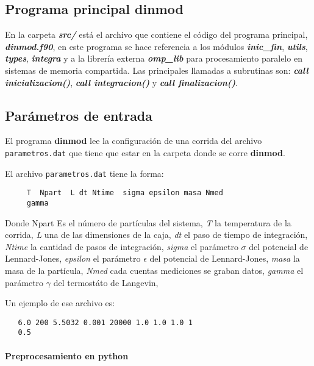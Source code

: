 \subsection{Programa principal dinmod}

En la carpeta \textbf{\textit{src/}} está el archivo que contiene el código del programa principal,
\textbf{\textit{dinmod.f90}}, en este programa se hace referencia a los módulos \textbf{\textit{inic\_fin}}, \textbf{\textit{utils}},
\textbf{\textit{types}}, \textbf{\textit{integra}} y a la librería externa \textbf{\textit{omp\_lib}} para procesamiento paralelo en sistemas de memoria compartida. 
Las principales llamadas a subrutinas son:
\textbf{\textit{call inicializacion()}},  \textbf{\textit{ call integracion()}} y \textbf{\textit{ call finalizacion()}}.



\subsection{Par\'ametros de entrada}

El programa \textbf{\textbf{dinmod}} lee la configuraci\'on de una corrida del 
archivo \texttt{parametros.dat} que tiene que estar en la carpeta donde se
corre \textbf{\textbf{dinmod}}.

El archivo \texttt{parametros.dat} tiene la forma: 

\begin{verbatim}
     T  Npart  L dt Ntime  sigma epsilon masa Nmed
     gamma
\end{verbatim}

Donde Npart
Es el número de partículas del sistema, \textit{T} la temperatura de la corrida,
\textit{L} una de las dimensiones de la caja, \textit{dt} el paso de tiempo de integración,
\textit{Ntime} la cantidad de pasos de integración,
\textit{sigma} el parámetro $\sigma$ del potencial de Lennard-Jones,
\textit{epsilon} el parámetro $\epsilon$ del potencial de Lennard-Jones,
\textit{masa} la masa de la partícula,
\textit{Nmed} cada cuentas mediciones se graban datos,
\textit{gamma} el parámetro $\gamma$ del termostáto de Langevin,

Un ejemplo de ese archivo es:

\begin{verbatim}
   6.0 200 5.5032 0.001 20000 1.0 1.0 1.0 1
   0.5
\end{verbatim}

\paragraph{Preprocesamiento en python}

